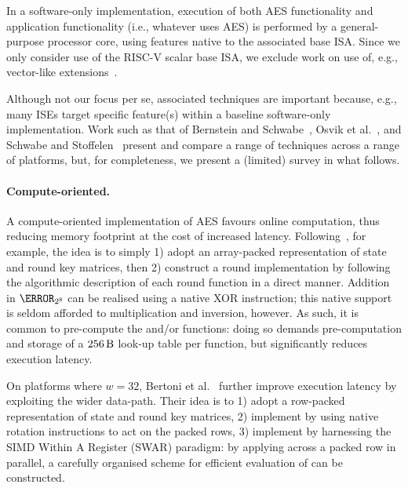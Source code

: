 
In a software-only implementation,
execution of 
both
AES         functionality
and
application functionality (i.e., whatever uses AES)
is 
performed by 
a general-purpose processor core, using features native to the associated base ISA.
Since we only consider use of the RISC-V scalar base ISA, we exclude work on
use of, e.g., vector-like extensions~\cite{Hamburg:09}.

Although not our focus per se, associated techniques are important because, 
e.g., many ISEs target specific feature(s) within a baseline software-only 
implementation.
Work such as that of
Bernstein and Schwabe~\cite{BerSch:08},
Osvik et al.~\cite{OBSC:10},
and
Schwabe and Stoffelen~\cite{SchSto:16}
present and compare a range of techniques across a range of platforms, but,
for completeness, we present a (limited) survey in what follows.


\paragraph{Compute-oriented.}

A compute-oriented implementation of AES favours
 online     computation, 
thus reducing 
memory footprint
at the cost of increased 
latency.
Following~\cite[Section 4.1]{DaeRij:02}, for example, the idea is to simply
1) adopt an
    array-packed
   representation of state and round key matrices,
   then
2) construct a round implementation by following the algorithmic description
   of each round function in a direct manner.
Addition in $\F_{2^8}$ can be realised using a native XOR instruction; this
native support is seldom afforded to multiplication and inversion, however.
As such, it is common to pre-compute the  and/or  
functions:
doing so demands pre-computation and storage of a
$
\SI{256}{\byte}
$
look-up table per function, but significantly reduces execution latency.

On platforms where $w = 32$,
Bertoni et al.~\cite{BBFMM:02}
further improve execution latency by exploiting the wider data-path.  Their
idea is to
1) adopt a 
      row-packed
   representation of state and round key matrices,
2) implement
   by using native rotation instructions to act on the packed
   rows,
3) implement
   by harnessing the SIMD Within A Register (SWAR) paradigm:
   by applying
   across a packed row in parallel,
   a carefully organised scheme for efficient evaluation of
   can be constructed.

